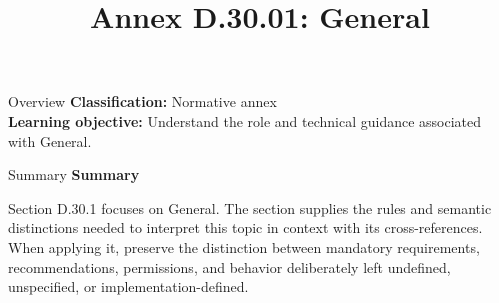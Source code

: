 \documentclass[10pt,letterpaper]{article}
\title{Annex D.30.01: General}
\author{}
\date{}
\begin{document}
\maketitle
\begin{CornellOverviewBox}{Overview}
\textbf{Classification:} Normative annex\\[2pt]
\textbf{Learning objective:} Understand the role and technical guidance associated with General.
\end{CornellOverviewBox}\begin{CornellSummaryBox}{Summary}
{\sffamily\bfseries\color{Accent} Summary}\par\vspace{3pt}Section D.30.1 focuses on General. The section supplies the rules and semantic distinctions needed to interpret this topic in context with its cross-references. When applying it, preserve the distinction between mandatory requirements, recommendations, permissions, and behavior deliberately left undefined, unspecified, or implementation-defined.
\end{CornellSummaryBox}
\end{document}

